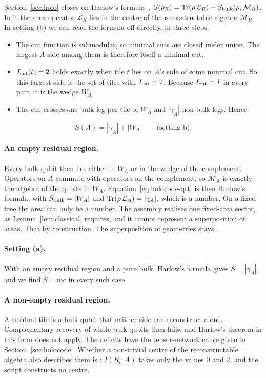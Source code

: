 Section~\ref{sec:holo} closes on Harlow's formula~\cite{harlow},
$S(\rho_R)=\operatorname{Tr}(\rho\,\mathcal L_R)+S_{\rm bulk}(\rho,\mathcal M_R)$. In it the area operator $\mathcal L_R$ lies in the centre of the
reconstructable algebra $\mathcal M_R$. In setting (b) we can read the formula off directly, in three steps.
\begin{itemize}[nosep]
\item The cut function is submodular, so minimal cuts are closed under union. The largest $A$-side among them is therefore itself a
  minimal cut.
\item $I_{\rm cut}(t)=2$ holds exactly when tile $t$ lies on $A$'s side of some minimal cut. So this largest side is the set of tiles
  with $I_{\rm cut}=2$. Because $I_{\rm cut}=I$ in every pair, it is the wedge $W_A$.
\item The cut crosses one bulk leg per tile of $W_A$ and $|\gamma_A|$ non-bulk legs. Hence
\end{itemize}
\begin{equation}\label{eq:holocode-qrt}
S(A)=|\gamma_A|+|W_A|\qquad\text{(setting b)}.
\end{equation}

\paragraph{An empty residual region.} Every bulk qubit then lies either in $W_A$ or in the wedge of the complement. Operators on $A$
commute with operators on the complement, so $\mathcal M_A$ is exactly the algebra of the qubits in $W_A$. Equation~\eqref{eq:holocode-qrt}
is then Harlow's formula, with $S_{\rm bulk}=|W_A|$ and $\operatorname{Tr}(\rho\,\mathcal L_A)=|\gamma_A|$, which is a number. On a fixed tree the area
can only be a number. The assembly realises one fixed-area sector, as Lemma~\ref{lem:classical} requires, and it cannot represent a
superposition of areas. That  by construction. The superposition of geometries stays .

\paragraph{Setting (a).} With an empty residual region and a pure bulk, Harlow's formula gives $S=|\gamma_A|$, and we find
$S=\mathrm{mc}$ in every such case.

\paragraph{A non-empty residual region.} A residual tile is a bulk qubit that neither side can reconstruct alone. Complementary
recovery of whole bulk qubits then fails, and Harlow's theorem in this form does not apply. The deficits have the tensor-network cause
given in Section~\ref{sec:holocode}. Whether a non-trivial centre of the reconstructable algebra also describes them is
: $I(R_t\!:\!A)$ takes only the values 0 and 2, and the script constructs no centre.

